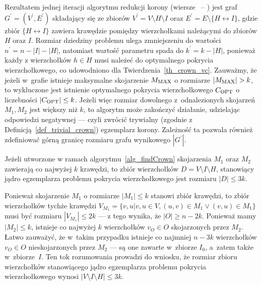 \par{
  Rezultatem jednej iteracji algorytmu redukcji korony (wiersze~ -- ) jest graf
  $G^\prime=(V^\prime, E^\prime)$ składający się ze zbiorów $V^\prime=V\setminus H \setminus I$ oraz $E^\prime = E \setminus \{H\leftrightarrow I\}$, gdzie zbiór $\{H\leftrightarrow I\}$ zawiera krawędzie pomiędzy wierzchołkami należącymi do zbiorów $H$ oraz $I$.
  Rozmiar dziedziny problemu ulega zmniejszeniu do wartości $n^\prime=n-|I|-|H|$, natomiast wartość parametru spada do $k^\prime=k-|H|$, ponieważ każdy z wierzchołków $h \in H$ musi należeć do optymalnego pokrycia wierzchołkowego, co udowodniono dla Twierdzenia~\ref{th_crown_vc}.
  Zauważmy, że jeżeli w~grafie istnieje maksymalne skojarzenie $M_{\textnormal{MAX}}$ o rozmiarze $|M_{\textnormal{MAX}}| > k$, to wykluczone jest istnienie optymalnego pokrycia wierzchołkowego $C_{\textnormal{OPT}}$ o liczebności $|C_{\textnormal{OPT}}|\leq k$.
  Jeżeli więc rozmiar dowolnego z~odnalezionych skojarzeń $M_1, M_2$ jest większy niż $k$, to algorytm może zakończyć działanie, udzielając odpowiedzi negatywnej --- czyli zwrócić trywialny (zgodnie z Definicją~\ref{def_trivial_crown}) egzemplarz korony.
  Zależność ta pozwala również zdefiniować górną granicę rozmiaru grafu wynikowego $|G^\prime|$.
}
\begin{theorem}
  Jeżeli utworzone w ramach algorytmu~\ref{alg_findCrown} skojarzenia $M_1$ oraz $M_2$ zawierają co najwyżej $k$ krawędzi, to zbiór wierzchołków $D=V \setminus I \setminus H$, stanowiący jądro egzemplarza problemu pokrycia wierzchołkowego jest rozmiaru $|D| \leq 3k$.
\end{theorem}
\begin{bproof}
  Ponieważ skojarzenie $M_1$ o rozmiarze $|M_1| \leq k$ stanowi zbiór krawędzi, to zbiór wierzchołków tychże krawędzi $V_{M_1}=\{v, u|v, u \in V, (u,v)\in M_1 \lor (v,u) \in M_1\}$ musi być rozmiaru $ |V_{M_1}| \leq 2k$ --- z tego wynika, że $|O| \geq n-2k$.
  Ponieważ mamy $|M_2| \leq k$, istnieje co najwyżej $k$ wierzchołków $v_O \in O$ skojarzonych przez $M_2$.
  Łatwo zauważyć, że w~takim przypadku istnieje co najmniej $n-3k$ wierzchołków $v_O \in O$ nieskojarzonych przez $M_2$ --- są one zawarte w~zbiorze $I_0$, a~zatem także w~zbiorze~$I$.
  Ten tok rozumowania prowadzi do wniosku, że rozmiar zbioru wierzchołków stanowiącego jądro egzemplarza problemu pokrycia wierzchołkowego wynosi $|V \setminus I \setminus H| \leq 3k$.
\end{bproof}
